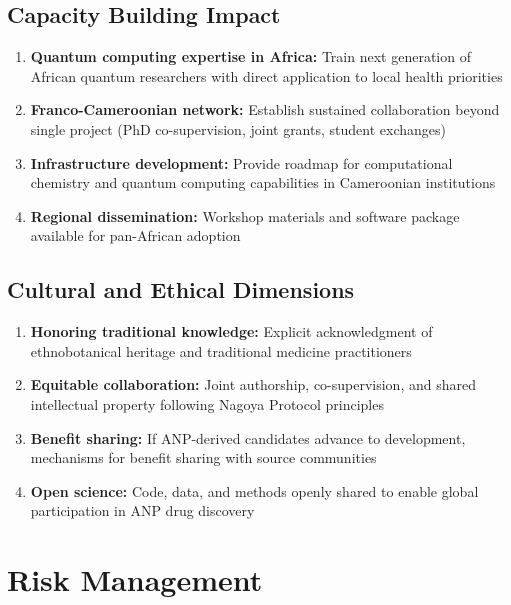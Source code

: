 \documentclass[11pt,a4paper]{article}
\begin{document}
\subsection{Capacity Building Impact}

\begin{enumerate}
    \item \textbf{Quantum computing expertise in Africa:} Train next generation of African quantum researchers with direct application to local health priorities
    
    \item \textbf{Franco-Cameroonian network:} Establish sustained collaboration beyond single project (PhD co-supervision, joint grants, student exchanges)
    
    \item \textbf{Infrastructure development:} Provide roadmap for computational chemistry and quantum computing capabilities in Cameroonian institutions
    
    \item \textbf{Regional dissemination:} Workshop materials and software package available for pan-African adoption
\end{enumerate}

\subsection{Cultural and Ethical Dimensions}

\begin{enumerate}
    \item \textbf{Honoring traditional knowledge:} Explicit acknowledgment of ethnobotanical heritage and traditional medicine practitioners
    
    \item \textbf{Equitable collaboration:} Joint authorship, co-supervision, and shared intellectual property following Nagoya Protocol principles
    
    \item \textbf{Benefit sharing:} If ANP-derived candidates advance to development, mechanisms for benefit sharing with source communities
    
    \item \textbf{Open science:} Code, data, and methods openly shared to enable global participation in ANP drug discovery
\end{enumerate}

\section{Risk Management}
\end{document}
